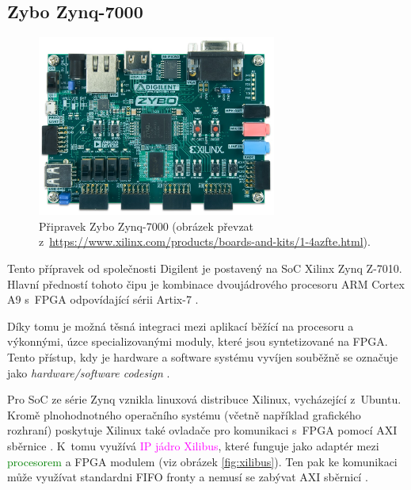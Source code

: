 \subsection{Zybo Zynq-7000}
\label{sec:an_zyb}

\begin{figure}[h!]
    \centering
    \includegraphics[width=0.7\textwidth]{images/zybo.jpg}
    \caption[Přípravek Zybo Zynq-7000]{Připravek Zybo Zynq-7000 (obrázek převzat z~\url{https://www.xilinx.com/products/boards-and-kits/1-4azfte.html}).}
    \label{fig:zybo}
\end{figure}

Tento přípravek od společnosti Digilent je postavený na SoC Xilinx Zynq Z-7010. Hlavní předností tohoto čipu je kombinace dvoujádrového procesoru ARM Cortex A9 s~FPGA odpovídající sérii Artix-7 \cite{zybo_man}. 

Díky tomu je možná těsná integraci mezi aplikací běžící na procesoru a výkonnými, úzce specializovanými moduly, které jsou syntetizované na FPGA. Tento přístup, kdy je hardware a software systému vyvíjen souběžně se označuje jako \textit{hardware/software codesign} \cite{hw_code}.

Pro SoC ze série Zynq vznikla linuxová distribuce Xilinux, vycházející z~Ubuntu. Kromě plnohodnotného operačního systému (včetně například grafického rozhraní) poskytuje Xilinux také ovladače pro komunikaci s~FPGA pomocí AXI sběrnice \cite{xilibus}. K~tomu využívá \textcolor{magenta}{IP jádro Xilibus}, které funguje jako adaptér mezi \textcolor{green}{procesorem} a FPGA modulem (viz obrázek \ref{fig:xilibus}). Ten pak ke komunikaci může využívat standardni \textcolor{blue2}{FIFO} fronty a nemusí se zabývat AXI sběrnicí \cite{xilibus}.

